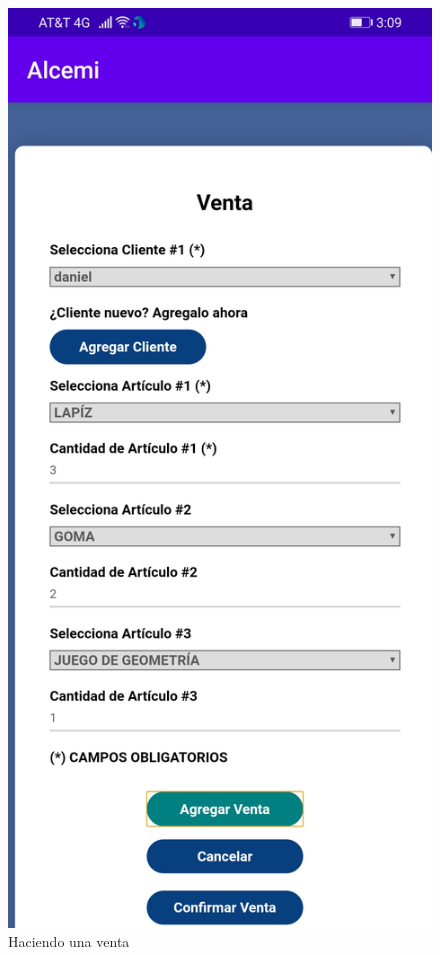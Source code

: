 \documentclass{article}
\begin{document}
\begin{figure}[h]
\begin{minipage}[t]{0.5\linewidth}
\end{minipage}
\begin{minipage}[t]{0.5\linewidth}
\caption {Haciendo una venta}
\centering
\includegraphics[scale=0.16]{fig13}
\end{minipage}
\end{figure}
\end{document}
